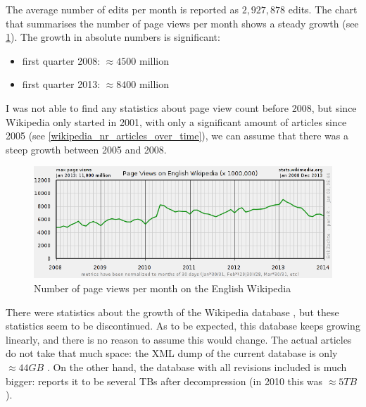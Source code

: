 \documentclass[12pt]{report}
\begin{document}
The average number of edits per month is reported as $2,927,878$
edits.
The chart that summarises the number of page views per month shows 
a steady growth (see \cref{wikipedia_page_views}). The growth in absolute
numbers is significant:
\begin{itemize}
\item first quarter 2008: $\approx 4500$ million
\item first quarter 2013: $\approx 8400$ million
\end{itemize}
I was not able to find any statistics about page view count before
2008, but since Wikipedia only started in 2001, with only a
significant amount of articles since 2005 (see \cref{wikipedia_nr_articles_over_time}), we can assume that there
was a steep growth between 2005 and 2008.
\begin{figure}[h!]
  \caption{Number of page views per month on the English Wikipedia}
  \label{wikipedia_page_views}
  \centering
    \includegraphics[scale=0.5]{pics/wikipedia_page_views.png}
\end{figure}
There were statistics about the growth of the Wikipedia database
\cite{wikipedia_database_growth}, but these statistics seem to be
discontinued. As to be expected, this database keeps growing linearly,
and there is no reason to assume this would change.
The actual articles do not take that much space: the XML dump of the
current database is only $\approx 44 GB$ \cite{wikipedia_size}. 
On the other hand, the database with all
revisions included is much bigger: \cite{wikipedia_size} reports it to be several
TBs after decompression (in 2010 this was $\approx 5TB$ \cite{wikipedia_full_size}).
\end{document}

